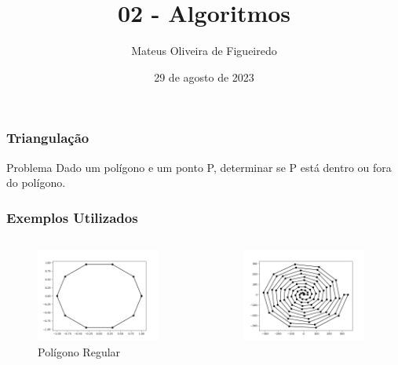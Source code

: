 \documentclass[aspectratio=169,usenames,dvipsnames]{beamer}
\title{02 - Algoritmos}
\author{Mateus Oliveira de Figueiredo}
\date{29 de agosto de 2023}
\begin{document}
\begin{frame}
\titlepage
\end{frame}

\begin{frame}
\frametitle{Triangulação}
  \begin{block}{Problema}
    Dado um polígono e um ponto P, determinar se P está dentro ou fora do polígono.
  \end{block}
\end{frame}

\begin{frame}
\frametitle{Exemplos Utilizados}
  \begin{columns}
    \begin{center}
        \begin{figure}
          \includegraphics[width=0.95\textwidth]{figures/regular_10.png}
          \caption{Polígono Regular}
        \end{figure}
    \end{center}
    \begin{center}
        \begin{figure}
          \includegraphics[width=0.95\textwidth]{figures/spiral_100.png}

\end{figure}
\end{center}
\end{columns}
\end{frame}
\end{document}
